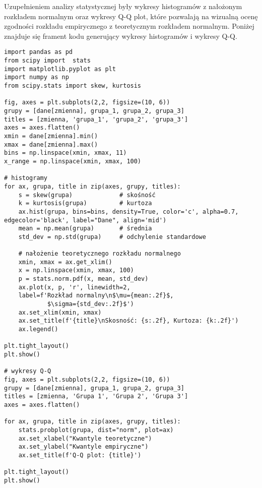 \documentclass[12pt,a4paper]{article}
\begin{document}
Uzupełnieniem analizy statystycznej były wykresy histogramów z nałożonym rozkładem normalnym oraz wykresy Q-Q plot, które pozwalają na wizualną ocenę zgodności rozkładu empirycznego z teoretycznym rozkładem normalnym.
\newpage
Poniżej znajduje się frament kodu generujący wykresy histogramów i wykresy Q-Q.
\begin{lstlisting}
import pandas as pd
from scipy import  stats
import matplotlib.pyplot as plt
import numpy as np
from scipy.stats import skew, kurtosis

fig, axes = plt.subplots(2,2, figsize=(10, 6))
grupy = [dane[zmienna], grupa_1, grupa_2, grupa_3]
titles = [zmienna, 'grupa_1', 'grupa_2', 'grupa_3']
axes = axes.flatten()
xmin = dane[zmienna].min()
xmax = dane[zmienna].max()
bins = np.linspace(xmin, xmax, 11)
x_range = np.linspace(xmin, xmax, 100)

# histogramy
for ax, grupa, title in zip(axes, grupy, titles):
    s = skew(grupa)             # skośność
    k = kurtosis(grupa)         # kurtoza
    ax.hist(grupa, bins=bins, density=True, color='c', alpha=0.7, edgecolor='black', label="Dane", align='mid')
    mean = np.mean(grupa)       # średnia
    std_dev = np.std(grupa)     # odchylenie standardowe

    # nałożenie teoretycznego rozkładu normalnego
    xmin, xmax = ax.get_xlim()
    x = np.linspace(xmin, xmax, 100)
    p = stats.norm.pdf(x, mean, std_dev)
    ax.plot(x, p, 'r', linewidth=2, 
    label=f'Rozkład normalny\n$\mu={mean:.2f}$,
            $\sigma={std_dev:.2f}$')
    ax.set_xlim(xmin, xmax)
    ax.set_title(f'{title}\nSkosność: {s:.2f}, Kurtoza: {k:.2f}')
    ax.legend()
    
plt.tight_layout()
plt.show()

# wykresy Q-Q
fig, axes = plt.subplots(2,2, figsize=(10, 6))
grupy = [dane[zmienna], grupa_1, grupa_2, grupa_3]
titles = [zmienna, 'Grupa 1', 'Grupa 2', 'Grupa 3']
axes = axes.flatten()

for ax, grupa, title in zip(axes, grupy, titles):
    stats.probplot(grupa, dist="norm", plot=ax)
    ax.set_xlabel("Kwantyle teoretyczne")
    ax.set_ylabel("Kwantyle empiryczne")
    ax.set_title(f'Q-Q plot: {title}')

plt.tight_layout()
plt.show()
\end{lstlisting}



\newpage
\end{document}
